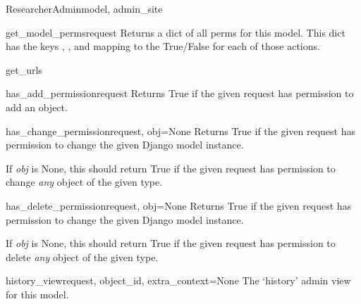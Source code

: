 \documentclass[letterpaper,10pt,english]{sphinxmanual}
\begin{document}
\begin{classdesc}{ResearcherAdmin}{model, admin\_site}
\hypertarget{data.admin.ResearcherAdmin.get_model_perms}{}\begin{methoddesc}{get\_model\_perms}{request}
Returns a dict of all perms for this model. This dict has the keys
, , and  mapping to the True/False for each
of those actions.
\end{methoddesc}

\hypertarget{data.admin.ResearcherAdmin.get_urls}{}\begin{methoddesc}{get\_urls}{}\end{methoddesc}

\hypertarget{data.admin.ResearcherAdmin.has_add_permission}{}\begin{methoddesc}{has\_add\_permission}{request}
Returns True if the given request has permission to add an object.
\end{methoddesc}

\hypertarget{data.admin.ResearcherAdmin.has_change_permission}{}\begin{methoddesc}{has\_change\_permission}{request, obj=None}
Returns True if the given request has permission to change the given
Django model instance.

If \emph{obj} is None, this should return True if the given request has
permission to change \emph{any} object of the given type.
\end{methoddesc}

\hypertarget{data.admin.ResearcherAdmin.has_delete_permission}{}\begin{methoddesc}{has\_delete\_permission}{request, obj=None}
Returns True if the given request has permission to change the given
Django model instance.

If \emph{obj} is None, this should return True if the given request has
permission to delete \emph{any} object of the given type.
\end{methoddesc}

\hypertarget{data.admin.ResearcherAdmin.history_view}{}\begin{methoddesc}{history\_view}{request, object\_id, extra\_context=None}
The `history' admin view for this model.
\end{methoddesc}


\end{classdesc}
\end{document}
